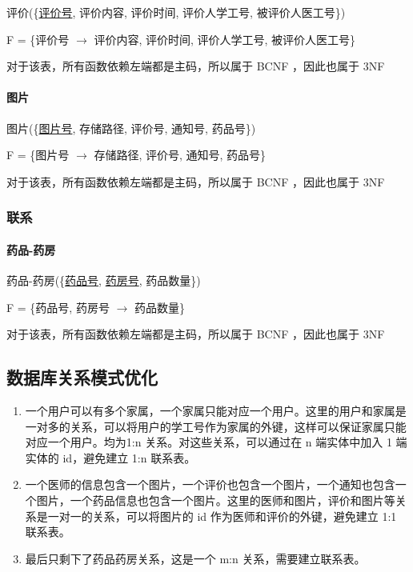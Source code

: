 \documentclass{article}
\begin{document}
评价(\{\underline{评价号}, 评价内容, 评价时间, 评价人学工号, 被评价人医工号\})

F = \{评价号 $\rightarrow$ 评价内容, 评价时间, 评价人学工号, 被评价人医工号\}

对于该表，所有函数依赖左端都是主码，所以属于 BCNF ，因此也属于 3NF

\paragraph{图片}

图片(\{\underline{图片号}, 存储路径, 评价号, 通知号, 药品号\})

F = \{图片号 $\rightarrow$ 存储路径, 评价号, 通知号, 药品号\}

对于该表，所有函数依赖左端都是主码，所以属于 BCNF ，因此也属于 3NF

\subsubsection{联系}

\paragraph{药品-药房}

药品-药房(\{\underline{药品号}, \underline{药房号}, 药品数量\})

F = \{药品号, 药房号 $\rightarrow$ 药品数量\}

对于该表，所有函数依赖左端都是主码，所以属于 BCNF ，因此也属于 3NF

\subsection{数据库关系模式优化}

\begin{enumerate}
    \item 一个用户可以有多个家属，一个家属只能对应一个用户。这里的用户和家属是一对多的关系，可以将用户的学工号作为家属的外键，这样可以保证家属只能对应一个用户。均为1:n 关系。对这些关系，可以通过在 n 端实体中加入 1 端实体的 id，避免建立 1:n 联系表。
    \item 一个医师的信息包含一个图片，一个评价也包含一个图片，一个通知也包含一个图片，一个药品信息也包含一个图片。这里的医师和图片，评价和图片等关系是一对一的关系，可以将图片的 id 作为医师和评价的外键，避免建立 1:1 联系表。
    \item 最后只剩下了药品药房关系，这是一个 m:n 关系，需要建立联系表。
\end{enumerate}
\end{document}
